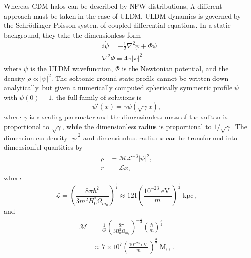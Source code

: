 \documentclass{pasa}%
\begin{document}
Whereas CDM halos can be described by NFW distributions, A different approach must be taken in the case of ULDM. ULDM dynamics is governed by the Schr{\"o}dinger-Poisson system of coupled differential equations. In a static background, they take the dimensionless form  
%
\begin{align}
    &i\dot{\psi} = -\frac{1}{2}\nabla^2\psi+\Phi\psi \\
    &\nabla^2\Phi = 4\pi \vert \psi\vert^2
\end{align}
%
where $\psi$ is the ULDM wavefunction, $\Phi$ is the Newtonian potential, and the density $\rho \propto |\psi|^2$. The solitonic ground state profile cannot be written down analytically, but given a numerically computed spherically symmetric  profile $\psi$ with $\psi(0)=1$, the full family of solutions is
%
\begin{equation}
    \psi'(x) = \gamma\psi(\sqrt{\gamma}x),
\end{equation}
%
where $\gamma$ is a scaling parameter and the dimensionless mass of the soliton is proportional to $\sqrt{\gamma}$, while the dimensionless radius is proportional to $1/\sqrt{\gamma}$. The dimensionless density $\vert\psi\vert^2$ and dimensionless radius $x$ can be transformed into dimensionful quantities by
\begin{align}
    \rho &= \mathcal{M}\mathcal{L}^{-3}\vert\psi\vert^2, \label{eq:density_conv} \\
    r &= \mathcal{L}x, \label{eq:mass_conv}
\end{align}
where
\begin{equation}\label{eq:length}
    \mathcal{L}=\left(\frac{8\pi\hbar^2}{3 m^2H_0^2\Omega_{m_0}}\right)^{\frac{1}{4}}\approx121\left(\frac{10^{-23}\operatorname{eV}}{m}\right)^{\frac{1}{2}}\operatorname{kpc},
\end{equation}
%
and 
%
\begin{align}\label{eq:mass}
    \mathcal{M}&=\frac{1}{G}\left(\frac{8\pi}{3 H_0^2\Omega_{m_0}}\right)^{-\frac{1}{4}}\left(\frac{\hbar}{m}\right)^{\frac{3}{2}}\nonumber\\
    &\approx 7\times 10^7\left(\frac{10^{-23}\operatorname{eV}}{m}\right)^{\frac{3}{2}}\operatorname{M}_{\odot}.
\end{align}
\end{document}
